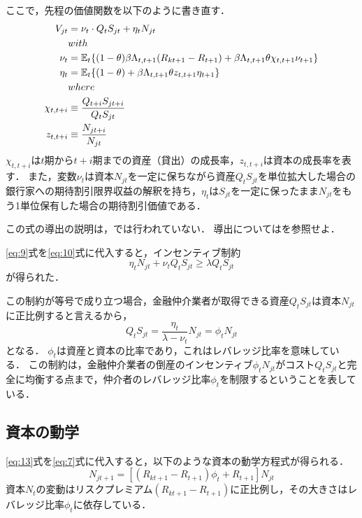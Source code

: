 \documentclass[dvipdfmx]{jlreq}
\begin{document}
ここで，先程の価値関数を以下のように書き直す．
\begin{align}
  V_{jt} &= \nu_t \cdot Q_t S_{jt} + \eta_t N_{jt} \label{eq:10} \\
  &with \notag \\
  \nu_t &= \mathbb{E}_t \{(1-\theta) \beta \Lambda_{t,t+1} (R_{kt+1} - R_{t+1}) + \beta \Lambda_{t,t+1} \theta \chi_{t,t+1} \nu_{t+1}\} \\
  \eta_t &= \mathbb{E}_t \{(1-\theta) + \beta \Lambda_{t,t+1} \theta z_{t,t+1} \eta_{t+1}\} \\
  &where \notag \\
  \chi_{t,t+i} &\equiv \frac{Q_{t+i} S_{jt+i}}{Q_t S_{jt}} \\
  z_{t,t+i} &\equiv \frac{N_{jt+i}}{N_{jt}}
\end{align}
$\chi_{t,t+i}$は$t$期から$t+i$期までの資産（貸出）の成長率，$z_{t,t+i}$は資本の成長率を表す．
また，変数$\nu_t$は資本$N_{jt}$を一定に保ちながら資産$Q_t S_{jt}$を単位拡大した場合の銀行家への期待割引限界収益の解釈を持ち，$\eta_t$は$S_{jt}$を一定に保ったまま$N_{jt}$をもう1単位保有した場合の期待割引価値である．

この式の導出の説明は，\textcite{GK2011}では行われていない．
導出については\textcite{V2021}を参照せよ．

\eqref{eq:9}式を\eqref{eq:10}式に代入すると，インセンティブ制約
\begin{equation}
  \eta_t N_{jt} + \nu_t Q_t S_{jt} \geq \lambda Q_t S_{jt}
\end{equation}
が得られた．

この制約が等号で成り立つ場合，金融仲介業者が取得できる資産$Q_t S_{jt}$は資本$N_{jt}$に正比例すると言えるから，
\begin{equation} \label{eq:13}
  Q_t S_{jt} = \frac{\eta_t}{\lambda-\nu_t} N_{jt} = \phi_t N_{jt}
\end{equation}
となる．
$\phi_t$は資産と資本の比率であり，これはレバレッジ比率を意味している．
この制約は，金融仲介業者の倒産のインセンティブ$\phi_t N_{jt}$がコスト$Q_t S_{jt}$と完全に均衡する点まで，仲介者のレバレッジ比率$\phi_t$を制限するということを表している．

\subsection*{資本の動学}
\eqref{eq:13}式を\eqref{eq:7}式に代入すると，以下のような資本の動学方程式が得られる．
\begin{equation} \label{eq:14}
  N_{jt+1} = [(R_{kt+1} - R_{t+1}) \phi_t + R_{t+1}] N_{jt}
\end{equation}
資本$N_t$の変動はリスクプレミアム$(R_{kt+1} - R_{t+1})$に正比例し，その大きさはレバレッジ比率$\phi_t$に依存している．
\end{document}
